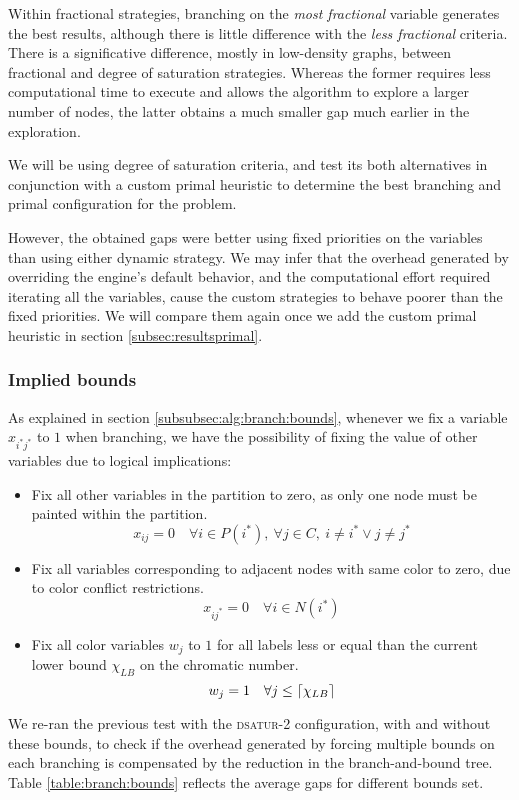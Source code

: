 Within fractional strategies, branching on the \textit{most fractional} variable generates the best results, although there is little difference with the \textit{less fractional} criteria. There is a significative difference, mostly in low-density graphs, between fractional and degree of saturation strategies. Whereas the former requires less computational time to execute and allows the algorithm to explore a larger number of nodes, the latter obtains a much smaller gap much earlier in the exploration.

We will be using degree of saturation criteria, and test its both alternatives in conjunction with a custom primal heuristic to determine the best branching and primal configuration for the problem.

However, the obtained gaps were better using fixed priorities on the variables than using either dynamic strategy. We may infer that the overhead generated by overriding the engine's default behavior, and the computational effort required iterating all the variables, cause the custom strategies to behave poorer than the fixed priorities. We will compare them again once we add the custom primal heuristic in section \ref{subsec:resultsprimal}.

\subsubsection*{Implied bounds}

As explained in section \ref{subsubsec:alg:branch:bounds}, whenever we fix a variable $x_{i^*j^*}$ to $1$ when branching, we have the possibility of fixing the value of other variables due to logical implications:
\begin{itemize}
\item Fix all other variables in the partition to zero, as only one node must be painted within the partition.
\[
x_{ij} = 0 \quad \forall i \in P(i^*),\ \forall j \in C,\ i \neq i^* \vee j \neq j^*
\]
\item Fix all variables corresponding to adjacent nodes with same color to zero, due to color conflict restrictions.
\[
x_{ij^*} = 0 \quad \forall i \in N(i^*)
\]
\item Fix all color variables $w_j$ to $1$ for all labels less or equal than the current lower bound $\chi_{LB}$ on the chromatic number.
\[
w_j = 1 \quad \forall j \leq \left\lceil \chi_{LB} \right\rceil
\] 
\end{itemize}

We re-ran the previous test with the \textsc{dsatur-2} configuration, with and without these bounds, to check if the overhead generated by forcing multiple bounds on each branching is compensated by the reduction in the branch-and-bound tree. Table \ref{table:branch:bounds} reflects the average gaps for different bounds set.

